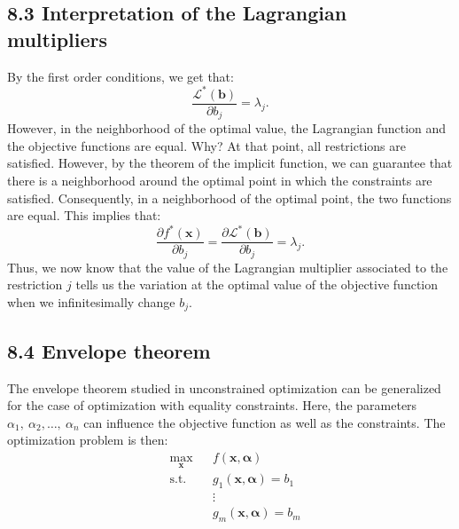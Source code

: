 \documentclass[0pt, a4paper]{article}
\newcommand{\Lagr}{\mathcal{L}}
\begin{document}
\subsection*{8.3 Interpretation of the Lagrangian multipliers}

By the first order conditions, we get that:
$$\frac{\Lagr^*(\textbf{b})}{\partial b_j}=\lambda_j.$$
However, in the neighborhood of the optimal value, the Lagrangian function and the objective functions are equal. Why? At that point, all restrictions are satisfied. However, by the theorem of the implicit function, we can guarantee that there is a neighborhood around the optimal point in which the constraints are satisfied. Consequently, in a neighborhood of the optimal point, the two functions are equal. This implies that:
$$\frac{\partial f^*(\textbf{x})}{\partial b_j}=\frac{\partial \Lagr^*(\textbf{b})}{\partial b_j}=\lambda_j.$$
Thus, we now know that the value of the Lagrangian multiplier associated to the restriction $j$ tells us the variation at the optimal value of the objective function when we infinitesimally change $b_j$. 

\subsection*{8.4 Envelope theorem}

The envelope theorem studied in unconstrained optimization can be generalized for the case of optimization with equality constraints. Here, the parameters $\alpha_1,\ \alpha_2,\dots,\ \alpha_n$ can influence the objective function as well as the constraints. The optimization problem is then:
\begin{equation*}
	\begin{aligned}
		& \underset{\textbf{x}}{\text{max}}
		& & f(\textbf{x},\boldsymbol{\alpha}) \\
		& \text{s.t.}
		& & g_1(\textbf{x},\boldsymbol{\alpha})=b_1\\
		& & & \vdots\\
		& & & g_m(\textbf{x},\boldsymbol{\alpha})=b_m\\
	\end{aligned}
\end{equation*}
\end{document}
